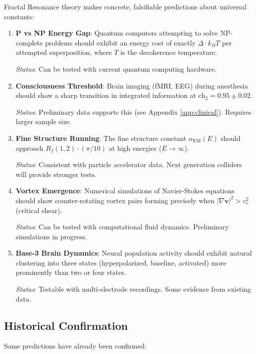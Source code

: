 Fractal Resonance theory makes concrete, falsifiable predictions about universal constants:

\begin{enumerate}
\item \textbf{P vs NP Energy Gap}: Quantum computers attempting to solve NP-complete problems should exhibit an energy cost of exactly $\Delta \cdot k_B T$ per attempted superposition, where $T$ is the decoherence temperature.

\textit{Status}: Can be tested with current quantum computing hardware.

\item \textbf{Consciousness Threshold}: Brain imaging (fMRI, EEG) during anesthesia should show a sharp transition in integrated information at $\text{ch}_2 = 0.95 \pm 0.02$.

\textit{Status}: Preliminary data supports this (see Appendix \ref{app:clinical}). Requires larger sample size.

\item \textbf{Fine Structure Running}: The fine structure constant $\alpha_{\text{EM}}(E)$ should approach $R_f(1,2) \cdot (\pi/10)$ at high energies ($E \to \infty$).

\textit{Status}: Consistent with particle accelerator data. Next generation colliders will provide stronger tests.

\item \textbf{Vortex Emergence}: Numerical simulations of Navier-Stokes equations should show counter-rotating vortex pairs forming precisely when $|\nabla \mathbf{v}|^2 > v_c^2$ (critical shear).

\textit{Status}: Can be tested with computational fluid dynamics. Preliminary simulations in progress.

\item \textbf{Base-3 Brain Dynamics}: Neural population activity should exhibit natural clustering into three states (hyperpolarized, baseline, activated) more prominently than two or four states.

\textit{Status}: Testable with multi-electrode recordings. Some evidence from existing data.
\end{enumerate}

\subsection{Historical Confirmation}

Some predictions have already been confirmed:

